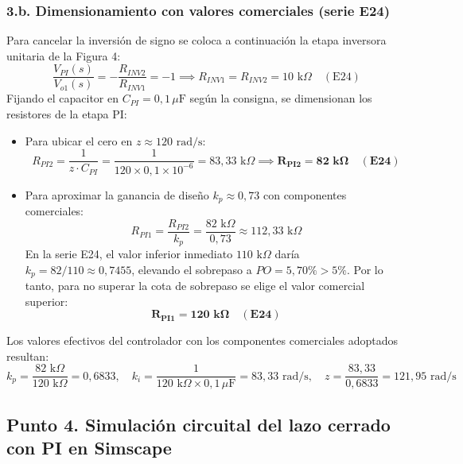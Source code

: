 \documentclass[11pt,a4paper]{article}
\begin{document}
\subsubsection*{3.b. Dimensionamiento con valores comerciales (serie E24)}
Para cancelar la inversión de signo se coloca a continuación la etapa inversora unitaria de la Figura 4:
\begin{equation}
    \frac{V_{PI}(s)}{V_{o1}(s)} = -\frac{R_{INV2}}{R_{INV1}} = -1 \implies R_{INV1} = R_{INV2} = 10\text{ k}\Omega \quad (\text{E24})
\end{equation}
Fijando el capacitor en $C_{PI} = 0{,}1\,\mu\text{F}$ según la consigna, se dimensionan los resistores de la etapa PI:
\begin{itemize}
    \item Para ubicar el cero en $z \approx 120\text{ rad/s}$:
    \begin{equation}
        R_{PI2} = \frac{1}{z \cdot C_{PI}} = \frac{1}{120 \times 0{,}1\times 10^{-6}} = 83{,}33\text{ k}\Omega \implies \mathbf{R_{PI2} = 82\text{ k}\Omega \quad (\text{E24})}
    \end{equation}
    \item Para aproximar la ganancia de diseño $k_p \approx 0{,}73$ con componentes comerciales:
    \begin{equation}
        R_{PI1} = \frac{R_{PI2}}{k_p} = \frac{82\text{ k}\Omega}{0{,}73} \approx 112{,}33\text{ k}\Omega
    \end{equation}
    En la serie E24, el valor inferior inmediato $110\text{ k}\Omega$ daría $k_p = 82/110 \approx 0{,}7455$, elevando el sobrepaso a $PO = 5{,}70\% > 5\%$. Por lo tanto, para no superar la cota de sobrepaso se elige el valor comercial superior:
    \begin{equation}
        \mathbf{R_{PI1} = 120\text{ k}\Omega \quad (\text{E24})}
    \end{equation}
\end{itemize}

Los valores efectivos del controlador con los componentes comerciales adoptados resultan:
\begin{equation}
    k_p = \frac{82\text{ k}\Omega}{120\text{ k}\Omega} = 0{,}6833, \quad k_i = \frac{1}{120\text{ k}\Omega \times 0{,}1\,\mu\text{F}} = 83{,}33\text{ rad/s}, \quad z = \frac{83{,}33}{0{,}6833} = 121{,}95\text{ rad/s}
\end{equation}


\subsection*{Punto 4. Simulación circuital del lazo cerrado con PI en Simscape}
\end{document}

